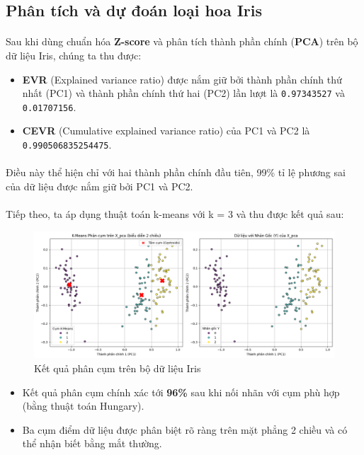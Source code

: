 \subsection{Phân tích và dự đoán loại hoa Iris}
\paragraph{}{Sau khi dùng chuẩn hóa \textbf{Z-score} và phân tích thành phần chính (\textbf{PCA}) trên bộ dữ liệu Iris, chúng ta thu được:}
\begin{itemize}
    \item \textbf{EVR} (Explained variance ratio) được nắm giữ bởi thành phần chính thứ nhất (PC1) và thành phần chính thứ hai (PC2) lần lượt là \texttt{0.97343527}  và \texttt{0.01707156}.
    \item \textbf{CEVR} (Cumulative explained variance ratio) của PC1 và PC2 là \texttt{0.990506835254475}.
\end{itemize}

\paragraph{}{Điều này thể hiện chỉ với hai thành phần chính đầu tiên, 99\% tỉ lệ phương sai của dữ liệu được nắm giữ bởi PC1 và PC2.}

\paragraph{}{Tiếp theo, ta áp dụng thuật toán k-means với k = 3 và thu được kết quả sau:}

\begin{figure}[H]
    \centering
    \includegraphics[width=1\linewidth]{img/iris_plot.png}
    \caption{Kết quả phân cụm trên bộ dữ liệu Iris}
    \label{fig:iris_plot}
\end{figure}

\begin{itemize}
    \item Kết quả phân cụm chính xác tới \textbf{96\%} sau khi nối nhãn với cụm phù hợp (bằng thuật toán Hungary).
    \item Ba cụm điểm dữ liệu được phân biệt rõ ràng trên mặt phẳng 2 chiều và có thể nhận biết bằng mắt thường.
\end{itemize}

\pagebreak